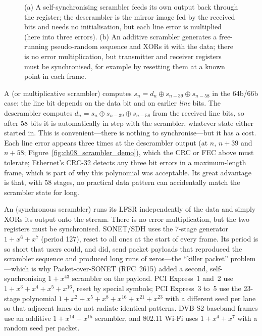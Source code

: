 \begin{figure}[htbp]
\caption{(a) A self-synchronising scrambler feeds its own output back through the
register; the descrambler is the mirror image fed by the received bits and needs no
initialisation, but each line error is multiplied (here into three errors). (b) An
additive scrambler generates a free-running pseudo-random sequence and XORs it with the
data; there is no error multiplication, but transmitter and receiver registers must be
synchronised, for example by resetting them at a known point in each frame.}
\label{fig:ch08_scrambler}
\end{figure}

A  (or multiplicative scrambler) computes
$s_n=d_n\oplus s_{n-39}\oplus s_{n-58}$ in the 64b/66b case: the line bit depends on the data
bit and on earlier \emph{line} bits. The descrambler computes
$d_n=s_n\oplus s_{n-39}\oplus s_{n-58}$ from the received line bits, so after 58 bits it is
automatically in step with the scrambler, whatever state either started in. This is
convenient---there is nothing to synchronise---but it has a cost. Each line error appears
three times at the descrambler output (at $n$, $n+39$ and $n+58$;
Figure~\ref{fig:ch08_scrambler_demo}), which the CRC or FEC above must tolerate; Ethernet's
CRC-32 detects any three bit errors in a maximum-length frame, which is part of why this
polynomial was acceptable. Its great advantage is that, with 58 stages, no practical data
pattern can accidentally match the scrambler state for long.


An  (synchronous scrambler) runs its LFSR independently of the data
and simply XORs its output onto the stream. There is no error multiplication, but the two
registers must be synchronised. SONET/SDH uses the 7-stage generator $1+x^6+x^7$ (period 127),
reset to all ones at the start of every frame. Its period is so short that users could, and
did, send packet payloads that reproduced the scrambler sequence and produced long runs of
zeros---the ``killer packet'' problem---which is why Packet-over-SONET (RFC~2615) added a
second, self-synchronising $1+x^{43}$ scrambler on the payload. PCI Express~1 and~2 use
$1+x^3+x^4+x^5+x^{16}$, reset by special symbols; PCI Express~3 to~5 use the 23-stage polynomial
$1+x^2+x^5+x^8+x^{16}+x^{21}+x^{23}$ with a different seed per lane so that adjacent lanes do
not radiate identical patterns. DVB-S2 baseband frames use an additive $1+x^{14}+x^{15}$
scrambler, and 802.11 Wi-Fi uses $1+x^4+x^7$ with a random seed per packet.

